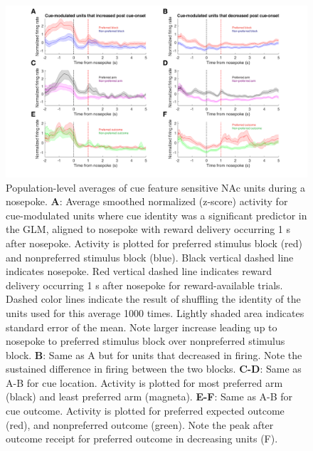\documentclass[11pt]{article}
\newcommand{\bsf}[1]{\textbf{#1}}
\begin{document}
{\begin{figure}[h]
\centering
\includegraphics[width=\textwidth]{Fig 11 - NP population averages.png}
\caption{Population-level averages of cue feature sensitive NAc units during a
  nosepoke. \bsf{A}: Average smoothed normalized (z-score) activity for cue-modulated
  units where cue identity was a significant predictor in the GLM, aligned to
  nosepoke with reward delivery occurring 1 s after nosepoke. Activity is
  plotted for preferred stimulus block (red) and nonpreferred stimulus block
  (blue). Black vertical dashed line indicates nosepoke. Red vertical dashed line indicates reward
  delivery occurring 1 s after nosepoke for reward-available trials. Dashed color lines indicate the result of shuffling the identity of the units used for this average 1000 times. Lightly
  shaded area indicates standard error of the mean. Note larger increase leading
  up to nosepoke to preferred stimulus block over nonpreferred stimulus
  block. \bsf{B}: Same as A but for units that decreased in firing. Note the
  sustained difference in firing between the two blocks. \bsf{C-D}: Same as A-B
  for cue location. Activity is plotted for most preferred arm (black) and least preferred arm (magneta). \bsf{E-F}: Same as A-B for cue outcome. Activity is plotted for
  preferred expected outcome (red), and nonpreferred outcome (green). Note the
  peak after outcome receipt for preferred outcome in decreasing units (F).}
\label{fig:NP_pop}
\end{figure}

}
\end{document}
